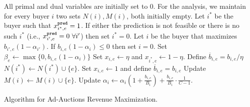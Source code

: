\begin{algorithm}[ht]
\begin{algorithmic}[1]  
\STATE All primal and dual variables are initially set to 0.
\STATE For the analysis, we maintain for every buyer $i$ two sets $N(i), M(i)$, both initially empty. 
	\STATE Let $i^{*}$ be the buyer such that $x^{\texttt{pred}}_{i^{*},e} = 1$. If either the prediction is not feasible or 
	 	there is no such $i^{*}$ (i.e., $x^{\texttt{pred}}_{i',e} = 0 ~\forall i'$) then
		set $i^{*} = 0$.  
	\STATE Let $i$ be the buyer that maximizes $b_{i',e} (1 - \alpha_{i'})$. 
		If $b_{i,e} (1 - \alpha_{i}) \leq 0$ then 
		set $i = 0$.
	\STATE Set $\beta_{e} \gets \max \bigl \{0,  b_{i,e} (1 - \alpha_{i}) \bigr \}$	 
		\STATE Set $x_{i,e} \gets \eta$ and $x_{i^{*},e} \gets 1-\eta$.
		\STATE Define $\overline{b}_{i,e} = b_{i,e}/\eta$ 
		\STATE $N(i^{*}) \gets N(i^{*}) \cup \{e\}$. 		
	\ELSE 
		\STATE Set $x_{i,e} \gets 1$ and define $\overline{b}_{i,e} = b_{i,e}$
	\ENDIF
	\STATE Update $M(i) \gets M(i) \cup \{e\}$.  
	\STATE Update $\alpha_{i} \gets \alpha_{i}\left( 1 + \frac{b_{i,e}}{B_{i}} \right) 
										+  \frac{b_{i,e}}{B_{i}} \cdot \frac{1}{C - 1}$.	
\ENDFOR
\end{algorithmic}
\caption{Algorithm for Ad-Auctions Revenue Maximization.}
\label{algo:ad-auctions}
\end{algorithm}




